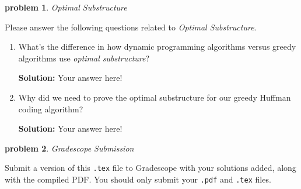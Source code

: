\documentclass[10pt]{article}
\newcommand{\solution}[1]{\color{blue}\hfill\break\noindent\textbf{Solution:} #1\color{black}}
\newtheorem{problem}{\sc\color{cit}problem}
\begin{document}
\begin{problem}Optimal Substructure\end{problem}
Please answer the following questions related to \emph{Optimal Substructure}.

\begin{enumerate}
\renewcommand{\theenumi}{\Alph{enumi}}

    \item What's the difference in how dynamic programming algorithms versus greedy algorithms use \emph{optimal substructure}?
    
    \solution{
    Your answer here!
    }
    \item Why did we need to prove the optimal substructure for our greedy Huffman coding algorithm?

    \solution{
    Your answer here!
    }
\end{enumerate}

\begin{problem} Gradescope Submission \end{problem}

Submit a version of this \verb|.tex| file to Gradescope with your solutions added, along with the compiled PDF.  You should only submit your \verb|.pdf| and \verb|.tex| files.
\end{document}
